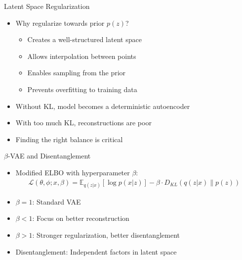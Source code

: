 \documentclass[5pt,aspectratio=169]{beamer}
\begin{document}
\begin{frame}{Latent Space Regularization}
\begin{itemize}
\item Why regularize towards prior $p(z)$?
  \begin{itemize}
  \item Creates a well-structured latent space
  \item Allows interpolation between points
  \item Enables sampling from the prior
  \item Prevents overfitting to training data
  \end{itemize}
\item Without KL, model becomes a deterministic autoencoder
\item With too much KL, reconstructions are poor
\item Finding the right balance is critical
\end{itemize}


\end{frame}

\begin{frame}{$\beta$-VAE and Disentanglement}
\begin{itemize}
\item Modified ELBO with hyperparameter $\beta$:
\begin{align}
\mathcal{L}(\theta, \phi; x, \beta) = \mathbb{E}_{q(z|x)}[\log p(x|z)] - \beta \cdot D_{KL}(q(z|x) \| p(z))
\end{align}
\item $\beta = 1$: Standard VAE
\item $\beta < 1$: Focus on better reconstruction
\item $\beta > 1$: Stronger regularization, better disentanglement
\item Disentanglement: Independent factors in latent space
\end{itemize}


\end{frame}
\end{document}
